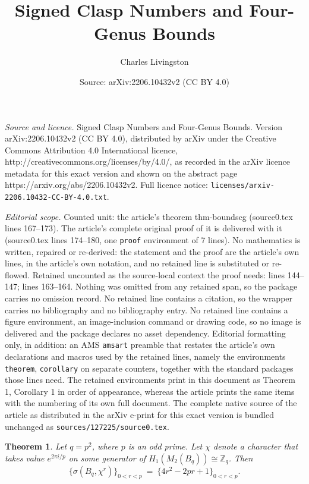 \documentclass[10pt,a4paper]{amsart}
\title{Signed Clasp Numbers and Four-Genus Bounds}
\author{Charles Livingston}
\date{Source: arXiv:2206.10432v2 (CC BY 4.0)}
\newtheorem{theorem}{Theorem}
\def\Z{{\mathbb Z}}
\begin{document}
\maketitle

\noindent\emph{Source and licence.} Signed Clasp Numbers and Four-Genus Bounds. Version arXiv:2206.10432v2 (CC BY 4.0), distributed by arXiv under the Creative Commons Attribution 4.0 International licence, http://creativecommons.org/licenses/by/4.0/, as recorded in the arXiv licence metadata for this exact version and shown on the abstract page https://arxiv.org/abs/2206.10432v2. Full licence notice: \texttt{licenses/arxiv-2206.10432-CC-BY-4.0.txt}.\par\smallskip

\noindent\textit{Editorial scope.} Counted unit: the article's theorem thm-boundscg (source0.tex lines 167--173). The article's complete original proof of it is delivered with it (source0.tex lines 174--180, one \texttt{proof} environment of 7 lines). No mathematics is written, repaired or re-derived: the statement and the proof are the article's own lines, in the article's own notation, and no retained line is substituted or re-flowed.  Retained uncounted as the source-local context the proof needs: lines 144--147; lines 163--164.  Nothing was omitted from any retained span, so the package carries no omission record.  No retained line contains a citation, so the wrapper carries no bibliography and no bibliography entry.  No retained line contains a figure environment, an image-inclusion command or drawing code, so no image is delivered and the package declares no asset dependency.  Editorial formatting only, in addition: an AMS \texttt{amsart} preamble that restates the article's own declarations and macros used by the retained lines, namely the environments \texttt{theorem}, \texttt{corollary} on separate counters, together with the standard packages those lines need.  The retained environments print in this document as Theorem 1, Corollary 1 in order of appearance, whereas the article prints the same items with the numbering of its own full document.  The complete native source of the article as distributed in the arXiv e-print for this exact version is bundled unchanged as \texttt{sources/127225/source0.tex}.
\begin{theorem}\label{thm-nonzero}
Let  $q = p^2$, where  $p$ is an odd prime.  Let $\chi$ denote a  character  that takes value  $e^{2 \pi i /p}$ on some generator of $H_1(M_2(B_q)) \cong \Z_q$.   Then
\[ \{\sigma(B_q, \chi^r)\}_{0<r< p}\ =\  \{  4r^2 - 2pr +1 \}_{0<r< p}.\]
\end{theorem}
\end{document}
